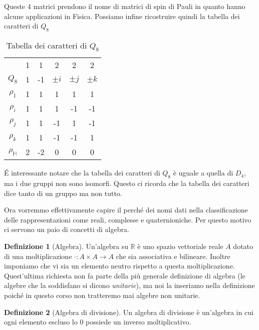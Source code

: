 \documentclass[11pt]{article}
\theoremstyle{plain}
\theoremstyle{definition}
\newtheorem{defn}{Definizione}[section]
\theoremstyle{remark}
\newcommand{\R}{\mathbb{R}}
\newcommand{\HH}{\mathbb{H}}
\begin{document}
Queste 4 matrici prendono il nome di matrici di spin di Pauli in quanto hanno alcune applicazioni in Fisica. Possiamo infine ricostruire quindi la tabella dei caratteri di $Q_8$

\begin{table}[!ht]
\centering
\begin{tabular}{|c|c|c|c|c|c|}
\hline
& 1 & 1 & 2 & 2 & 2 \\
$Q_8$ & 1 & -1 & $\pm i$ & $\pm j$ & $\pm k$ \\
\hline
$\rho_1$ & 1 & 1 & 1 & 1 & 1 \\
\hline
$\rho_i$ & 1 & 1 & 1 & -1 & -1 \\
\hline
$\rho_j$ & 1 & 1 & -1 & 1 & -1 \\
\hline
$\rho_k$ & 1 & 1 & -1 & -1 & 1 \\
\hline
$\rho_\HH$ & 2 & -2 & 0 & 0 & 0 \\
\hline
\end{tabular}
\caption{Tabella dei caratteri di $Q_8$}
\label{tab: caratteri q8}
\end{table}


\'E interessante notare che la tabella dei caratteri di $Q_8$ è uguale a quella di $D_4$, ma i due gruppi non sono isomorfi. Questo ci ricorda che la tabella dei caratteri dice tanto di un gruppo ma non tutto.





Ora vorremmo effettivamente capire il perché dei nomi dati nella classificazione delle rappresentazioni come reali, complesse e quaternioniche. Per questo motivo ci servono un paio di concetti di algebra.


\begin{defn}[Algebra]
Un'algebra su $\R$ è uno spazio vettoriale reale $A$ dotato di una moltiplicazione $\cdot : A \times A \to A$ che sia associativa e bilineare.
Inoltre imponiamo che vi sia un elemento neutro rispetto a questa moltiplicazione. Quest'ultima richiesta non fa parte della
più generale definizione di algebra (le algebre che la soddisfano si dicono \emph{unitarie}), ma noi la inseriamo nella definizione
poiché in questo corso non tratteremo mai algebre non unitarie.
\end{defn}


\begin{defn}[Algebra di divisione]
Un algebra di divisione è un'algebra in cui ogni elemento escluso lo $0$ possiede un inverso moltiplicativo.
\end{defn}
\end{document}
